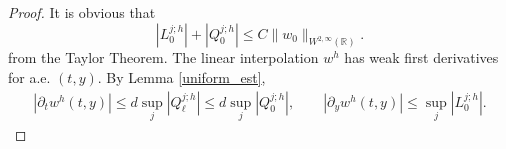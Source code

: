 \documentclass[a4paper,11pt]{article}
\def\red{\color{red}}
\def\R{\mathbb{R}}
\newtheorem{lemma}{Lemma}[section]
\theoremstyle{remark}
\begin{document}
\begin{proof}
It is obvious that
$$|L_0^{j;h}| + |Q_0^{j;h}| \le C\|w_0\|_{W^{2,\infty}(\R)}.$$
from the Taylor Theorem. The linear interpolation $w^h$ has weak first 
derivatives for a.e. $(t,y)$. By Lemma \ref{uniform_est},
 \begin{align*}
 |\partial_t w^h(t,y)| \le d\sup_j |Q^{j;h}_{\ell}|\le d\sup_j |Q^{j;h}_{0}|,\quad \quad
 |\partial_y w^h(t,y)| \le \sup_j |L_0^{j;h}|.
 \end{align*}
\end{proof}
% 
\end{document}
